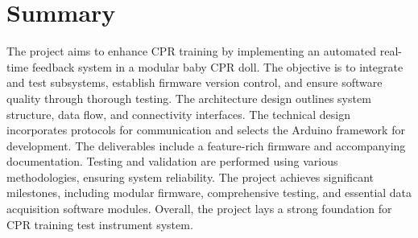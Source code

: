 \chapter{Summary}

The project aims to enhance CPR training by implementing an automated real-time feedback system in a modular baby CPR doll. The objective is to integrate and test subsystems, establish firmware version control, and ensure software quality through thorough testing. The architecture design outlines system structure, data flow, and connectivity interfaces. The technical design incorporates protocols for communication and selects the Arduino framework for development. The deliverables include a feature-rich firmware and accompanying documentation. Testing and validation are performed using various methodologies, ensuring system reliability. The project achieves significant milestones, including modular firmware, comprehensive testing, and essential data acquisition software modules. Overall, the project lays a strong foundation for CPR training test instrument system.